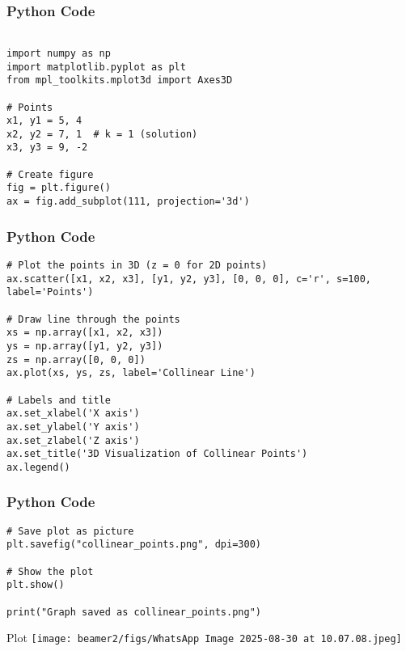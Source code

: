 \documentclass{beamer}
\begin{document}
\begin{frame}[fragile]
    \frametitle{Python Code }
    \begin{lstlisting}
    
import numpy as np
import matplotlib.pyplot as plt
from mpl_toolkits.mplot3d import Axes3D

# Points
x1, y1 = 5, 4
x2, y2 = 7, 1  # k = 1 (solution)
x3, y3 = 9, -2

# Create figure
fig = plt.figure()
ax = fig.add_subplot(111, projection='3d')
 \end{lstlisting}

\end{frame}
\begin{frame}[fragile]
    \frametitle{Python Code }
    \begin{lstlisting}
# Plot the points in 3D (z = 0 for 2D points)
ax.scatter([x1, x2, x3], [y1, y2, y3], [0, 0, 0], c='r', s=100, label='Points')

# Draw line through the points
xs = np.array([x1, x2, x3])
ys = np.array([y1, y2, y3])
zs = np.array([0, 0, 0])
ax.plot(xs, ys, zs, label='Collinear Line')

# Labels and title
ax.set_xlabel('X axis')
ax.set_ylabel('Y axis')
ax.set_zlabel('Z axis')
ax.set_title('3D Visualization of Collinear Points')
ax.legend()
\end{lstlisting}

\end{frame}
\begin{frame}[fragile]
    \frametitle{Python Code }
    \begin{lstlisting}
# Save plot as picture
plt.savefig("collinear_points.png", dpi=300)

# Show the plot
plt.show()

print("Graph saved as collinear_points.png")
     \end{lstlisting}

\end{frame}

\begin{frame}{Plot}
    \centering
    \texttt{[image: beamer2/figs/WhatsApp Image 2025-08-30 at 10.07.08.jpeg]}     
\end{frame}
\end{document}
